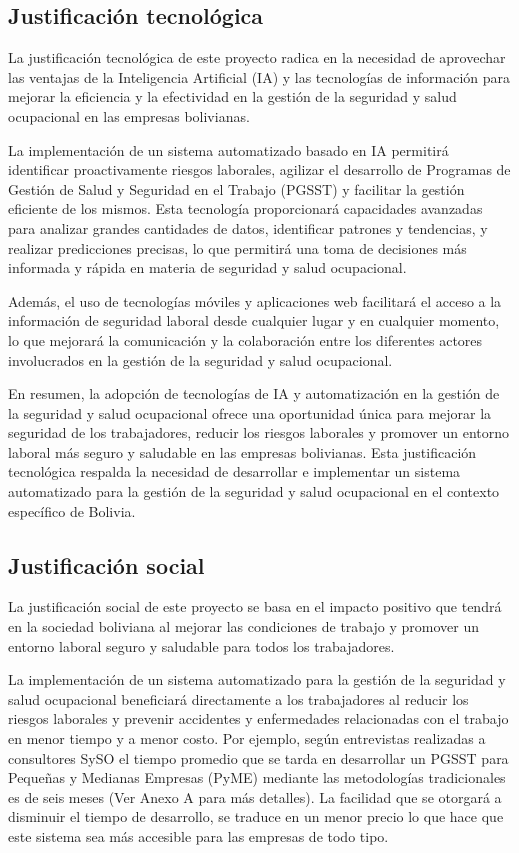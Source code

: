 \subsection{Justificación tecnológica}

La justificación tecnológica de este proyecto radica en la necesidad de aprovechar las ventajas de la Inteligencia Artificial (IA) y las tecnologías de información para mejorar la eficiencia y la efectividad en la gestión de la seguridad y salud ocupacional en las empresas bolivianas.

La implementación de un sistema automatizado basado en IA permitirá identificar proactivamente riesgos laborales, agilizar el desarrollo de Programas de Gestión de Salud y Seguridad en el Trabajo (PGSST) y facilitar la gestión eficiente de los mismos. Esta tecnología proporcionará capacidades avanzadas para analizar grandes cantidades de datos, identificar patrones y tendencias, y realizar predicciones precisas, lo que permitirá una toma de decisiones más informada y rápida en materia de seguridad y salud ocupacional.

Además, el uso de tecnologías móviles y aplicaciones web facilitará el acceso a la información de seguridad laboral desde cualquier lugar y en cualquier momento, lo que mejorará la comunicación y la colaboración entre los diferentes actores involucrados en la gestión de la seguridad y salud ocupacional.

En resumen, la adopción de tecnologías de IA y automatización en la gestión de la seguridad y salud ocupacional ofrece una oportunidad única para mejorar la seguridad de los trabajadores, reducir los riesgos laborales y promover un entorno laboral más seguro y saludable en las empresas bolivianas. Esta justificación tecnológica respalda la necesidad de desarrollar e implementar un sistema automatizado para la gestión de la seguridad y salud ocupacional en el contexto específico de Bolivia.

\subsection{Justificación social}

La justificación social de este proyecto se basa en el impacto positivo que tendrá en la sociedad boliviana al mejorar las condiciones de trabajo y promover un entorno laboral seguro y saludable para todos los trabajadores.

La implementación de un sistema automatizado para la gestión de la seguridad y salud ocupacional beneficiará directamente a los trabajadores al reducir los riesgos laborales y prevenir accidentes y enfermedades relacionadas con el trabajo en menor tiempo y a menor costo. Por ejemplo, según entrevistas realizadas a consultores SySO el tiempo promedio que se tarda en desarrollar un PGSST para Pequeñas y Medianas Empresas (PyME) mediante las metodologías tradicionales es de seis meses (Ver Anexo A para más detalles). La facilidad que se otorgará a disminuir el tiempo de desarrollo, se traduce en un menor precio lo que hace que este sistema sea más accesible para las empresas de todo tipo.

